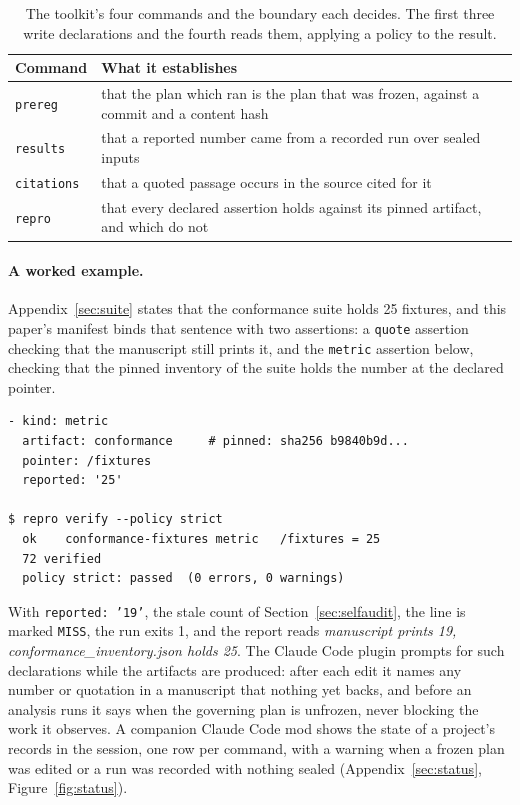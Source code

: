 \documentclass{article}
\newcommand{\code}[1]{\texttt{#1}}
\newcommand{\tPlan}{\code{prereg}}
\newcommand{\tRun}{\code{results}}
\newcommand{\tCite}{\code{citations}}
\newcommand{\tVerify}{\code{repro}}
\begin{document}
\begin{table}[h]
\centering
\small
\caption{The toolkit's four commands and the boundary each decides. The first three write declarations
and the fourth reads them, applying a policy to the result.}
\label{tab:commands}
\begin{tabular}{@{}>{\raggedright\arraybackslash}p{}>{\raggedright\arraybackslash}p{}@{}}
\toprule
\textbf{Command} & \textbf{What it establishes} \\
\midrule
\tPlan{} & that the plan which ran is the plan that was frozen, against a commit and a content hash \\
\tRun{} & that a reported number came from a recorded run over sealed inputs \\
\tCite{} & that a quoted passage occurs in the source cited for it \\
\tVerify{} & that every declared assertion holds against its pinned artifact, and which do not \\
\bottomrule
\end{tabular}
\end{table}

\paragraph{A worked example.} Appendix~\ref{sec:suite} states that the conformance suite holds 25
fixtures, and this paper's manifest binds that sentence with two assertions: a \code{quote}
assertion checking that the manuscript still prints it, and the \code{metric} assertion below,
checking that the pinned inventory of the suite holds the number at the declared pointer.
{\footnotesize
\begin{verbatim}
- kind: metric
  artifact: conformance     # pinned: sha256 b9840b9d...
  pointer: /fixtures
  reported: '25'

$ repro verify --policy strict
  ok    conformance-fixtures metric   /fixtures = 25
  72 verified
  policy strict: passed  (0 errors, 0 warnings)
\end{verbatim}}
\noindent With \code{reported: '19'}, the stale count of Section~\ref{sec:selfaudit}, the line is
marked \code{MISS}, the run exits 1, and the report reads \emph{manuscript prints 19,
conformance\_inventory.json holds 25}. The Claude Code plugin prompts for such
declarations while the artifacts are produced: after each edit it names any number or quotation in
a manuscript that nothing yet backs, and before an analysis runs it says when the governing plan is
unfrozen, never blocking the work it observes. A companion Claude Code mod shows the state of a project's
records in the session, one row per command, with a warning when a frozen plan was edited or a run
was recorded with nothing sealed (Appendix~\ref{sec:status}, Figure~\ref{fig:status}).
\end{document}
